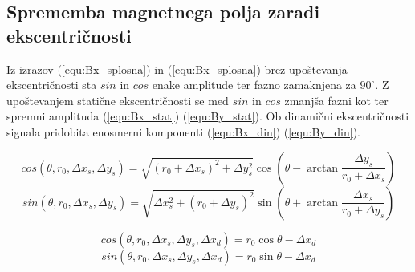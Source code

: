 \subsection{Sprememba magnetnega polja zaradi ekscentričnosti}



Iz izrazov (\ref{equ:Bx_splosna}) in (\ref{equ:Bx_splosna}) brez upoštevanja ekscentričnosti sta $sin$ in $cos$ enake amplitude ter fazno zamaknjena za $90^\circ$. Z upoštevanjem statične ekscentričnosti se med $sin$ in $cos$ zmanjša fazni kot ter spremni amplituda (\ref{equ:Bx_stat}) (\ref{equ:By_stat}). Ob dinamični ekscentričnosti signala pridobita enosmerni komponenti (\ref{equ:Bx_din}) (\ref{equ:By_din}).


\begin{equation}
\label{equ:Bx_stat}
cos(\theta,r_0,\Delta x_s, \Delta y_s)= \sqrt{(r_0+\Delta x_s)^2+\Delta y_s^2}\cos(\theta -\arctan \frac{\Delta y_s}{r_0+\Delta x_s})
\end{equation}
\begin{equation}\label{equ:By_stat}
sin(\theta,r_0,\Delta x_s, \Delta y_s)= \sqrt{\Delta x_s^2+(r_0+\Delta y_s)^2} \sin(\theta +\arctan \frac{\Delta x_s}{r_0+\Delta y_s})
\end{equation}


\begin{equation}
\label{equ:Bx_din}
cos(\theta,r_0,\Delta x_s, \Delta y_s, \Delta x_d)= r_0 \cos\theta-\Delta x_d
\end{equation}
\begin{equation}
\label{equ:By_din}
sin(\theta,r_0,\Delta x_s, \Delta y_s, \Delta x_d)= r_0 \sin\theta-\Delta x_d
\end{equation}

